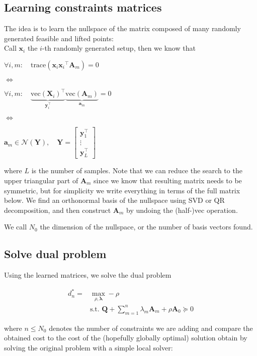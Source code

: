 \documentclass[11pt]{article}
\begin{document}
\subsection{Learning constraints matrices}

The idea is to learn the nullspace of the matrix composed of many
randomly generated feasible and lifted points:\\
Call \(\mathbf{x}_{i}\) the \(i\)-th randomly generated setup, then we
know that

\(\forall i, m: \quad \text{trace}(\mathbf{x}_{i}{\mathbf{x}_{i}}^\top\mathbf{A}_m) = 0\)

\(\iff\)

\(\forall i, m: \quad \underbrace{\text{vec}(\mathbf{X}_{i})^\top}_{\mathbf{y}_{i}^\top} \underbrace{\text{vec}(\mathbf{A}_m)}_{\mathbf{a}_m} = 0\)

\(\iff\)

\(\mathbf{a}_m \in \mathcal{N}(\mathbf{Y}), \quad \mathbf{Y} = \begin{bmatrix} \mathbf{y}_1^{\top} \\ \vdots \\ \mathbf{y}_L^{\top}\end{bmatrix}\)

where \(L\) is the number of samples. Note that we can reduce the search
to the upper triangular part of \(\mathbf{A}_m\) since we know that
resulting matrix needs to be symmetric, but for simplicity we write
everything in terms of the full matrix below. We find an orthonormal
basis of the nullspace using SVD or QR decomposition, and then construct
\(\mathbf{A}_m\) by undoing the (half-)vec operation.

We call \(N_0\) the dimension of the nullspace, or the number of basis
vectors found.

\subsection{Solve dual problem}

Using the learned matrices, we solve the dual problem

\begin{align} 
d_n^* = &\max_{\rho, \mathbf{\lambda}} -\rho \\
&\text{s.t. } \mathbf{Q} + \sum_{m=1}^n \lambda_m \mathbf{A}_m + \rho \mathbf{A}_0 \succeq 0
\end{align}

where \(n \leq N_0\) denotes the number of constraints we are adding and
compare the obtained cost to the cost of the (hopefully globally
optimal) solution obtain by solving the original problem with a simple
local solver:
\end{document}
